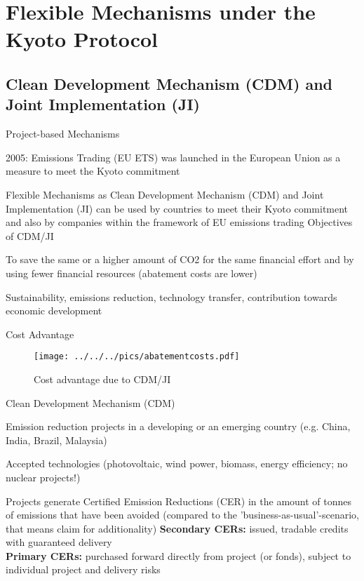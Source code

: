 \section{Flexible Mechanisms under the Kyoto Protocol}
\subsection{Clean Development Mechanism (CDM) and Joint Implementation (JI)}

{Project-based Mechanisms}
\item<1-> 2005:  Emissions Trading (EU ETS) was launched in the European Union as a measure to meet the Kyoto commitment
\item<2-> Flexible Mechanisms as Clean Development Mechanism (CDM) and Joint Implementation (JI) can be used by countries to meet their Kyoto commitment and also by companies within the framework of EU emissions trading
Objectives of CDM/JI
\item<1-> To save the same or a higher amount of CO2 for the same financial effort and by using fewer financial resources (abatement costs are lower)
\item<2-> Sustainability, emissions reduction, technology transfer, contribution towards economic development


{Cost Advantage}
\begin{figure}[h!]
\centering
\texttt{[image: ../../../pics/abatementcosts.pdf]}
\caption{Cost advantage due to CDM/JI}
\label{fig:CDM/JI}
\end{figure}


{Clean Development Mechanism (CDM)}
\item <1-> Emission reduction projects in a developing or an emerging country (e.g. China, India, Brazil, Malaysia)
\item <2-> Accepted technologies (photovoltaic, wind power, biomass, energy efficiency; no nuclear projects!)
\item <3-> Projects generate Certified Emission Reductions (CER) in the amount of tonnes of emissions that have been avoided (compared to the 'business-as-usual'-scenario, that means claim for additionality)
\textbf{Secondary CERs:} issued, tradable credits with guaranteed delivery \\
\textbf{Primary CERs:} purchased forward directly from project (or fonds), subject to individual project and delivery risks

